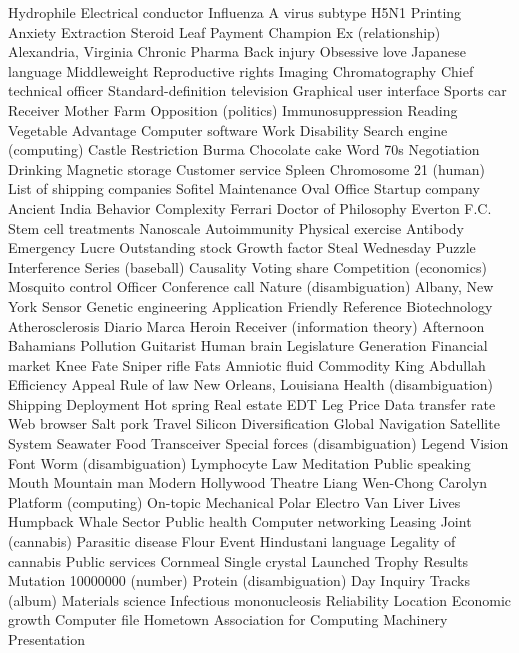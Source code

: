 Hydrophile  Electrical conductor  Influenza A virus subtype H5N1  
Printing  Anxiety  Extraction  
Steroid  Leaf  Payment  
Champion  Ex (relationship)  Alexandria, Virginia  
Chronic  Pharma  Back injury  
Obsessive love  Japanese language  Middleweight  
Reproductive rights  Imaging  Chromatography  
Chief technical officer  Standard-definition television  Graphical user interface  
Sports car  Receiver  Mother  
Farm  Opposition (politics)  Immunosuppression  
Reading  Vegetable  Advantage  
Computer software  Work  Disability  
Search engine (computing)  Castle  Restriction  
Burma  Chocolate cake  Word  
70s  Negotiation  Drinking  
Magnetic storage  Customer service  Spleen  
Chromosome 21 (human)  List of shipping companies  Sofitel  
Maintenance  Oval Office  Startup company  
Ancient India  Behavior  Complexity  
Ferrari  Doctor of Philosophy  Everton F.C.  
Stem cell treatments  Nanoscale  Autoimmunity  
Physical exercise  Antibody  Emergency  
Lucre  Outstanding stock  Growth factor  
Steal  Wednesday  Puzzle  
Interference  Series (baseball)  Causality  
Voting share  Competition (economics)  Mosquito control  
Officer  Conference call  Nature (disambiguation)  
Albany, New York  Sensor  Genetic engineering  
Application  Friendly  Reference  
Biotechnology  Atherosclerosis  Diario Marca  
Heroin  Receiver (information theory)  Afternoon  
Bahamians  Pollution  Guitarist  
Human brain  Legislature  Generation  
Financial market  Knee  Fate  
Sniper rifle  Fats  Amniotic fluid  
Commodity  King Abdullah  Efficiency  
Appeal  Rule of law  New Orleans, Louisiana  
Health (disambiguation)  Shipping  Deployment  
Hot spring  Real estate  EDT  
Leg  Price  Data transfer rate  
Web browser  Salt pork  Travel  
Silicon  Diversification  Global Navigation Satellite System  
Seawater  Food  Transceiver  
Special forces (disambiguation)  Legend  Vision  
Font  Worm (disambiguation)  Lymphocyte  
Law  Meditation  Public speaking  
Mouth  Mountain man  Modern  
Hollywood Theatre  Liang Wen-Chong  Carolyn  
Platform (computing)  On-topic  Mechanical  
Polar Electro  Van  Liver  
Lives  Humpback Whale  Sector  
Public health  Computer networking  Leasing  
Joint (cannabis)  Parasitic disease  Flour  
Event  Hindustani language  Legality of cannabis  
Public services  Cornmeal  Single crystal  
Launched  Trophy  Results  
Mutation  10000000 (number)  Protein (disambiguation)  
Day  Inquiry  Tracks (album)  
Materials science  Infectious mononucleosis  Reliability  
Location  Economic growth  Computer file  
Hometown  Association for Computing Machinery  Presentation  
